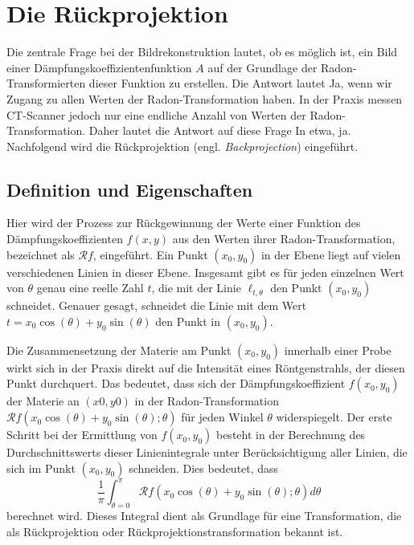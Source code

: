 %
%
%
%
\section{Die Rückprojektion
	\label{ct:section:ruekprojektion}}
Die zentrale Frage bei der Bildrekonstruktion lautet, ob es möglich ist, ein Bild einer Dämpfungskoeffizientenfunktion $A$ auf der Grundlage der Radon-Transformierten dieser Funktion zu erstellen. Die Antwort lautet \glqq Ja\grqq, wenn wir Zugang zu allen Werten der Radon-Transformation haben. In der Praxis messen CT-Scanner jedoch nur eine endliche Anzahl von Werten der Radon-Transformation. Daher lautet die Antwort auf diese Frage \glqq In etwa, ja\grqq. Nachfolgend wird die Rückprojektion (engl. \emph{Backprojection}) eingeführt.  

\subsection{Definition und Eigenschaften
	\label{ct:subsection:defnprop}}
Hier wird der Prozess zur Rückgewinnung der Werte einer Funktion des Dämpfungskoeffizienten $f(x, y)$ aus den Werten ihrer Radon-Transformation, bezeichnet als $\mathscr{R}f$, eingeführt. Ein Punkt $(x_0, y_0)$ in der Ebene liegt auf vielen verschiedenen Linien in dieser Ebene. Insgesamt gibt es für jeden einzelnen Wert von $\theta$ genau eine reelle Zahl $t$, die mit der Linie $\ell_{t,\theta}$ den Punkt $(x_0, y_0)$ schneidet. Genauer gesagt, schneidet die Linie mit dem Wert $t = x_0\cos(\theta) + y_0\sin(\theta)$ den Punkt in $(x_0, y_0)$.  

Die Zusammensetzung der Materie am Punkt $(x_0, y_0)$ innerhalb einer Probe wirkt sich in der Praxis direkt auf die Intensität eines Röntgenstrahls, der diesen Punkt durchquert. Das bedeutet, dass sich der Dämpfungskoeffizient $f(x_0, y_0)$ der Materie an $(x0, y0)$ in der Radon-Transformation $\mathscr{R}f(x_0\cos(\theta) + y_0\sin(\theta); \theta)$ für jeden Winkel $\theta$ widerspiegelt. Der erste Schritt bei der Ermittlung von $f(x_0, y_0)$ besteht in der Berechnung des Durchschnittswerts dieser Linienintegrale unter Berücksichtigung aller Linien, die sich im Punkt $(x_0, y_0)$ schneiden. Dies bedeutet, dass
\begin{equation}
	\dfrac{1}{\pi}\int_{\theta=0}^{\pi} \mathscr{R}f(x_0\cos(\theta) + y_0\sin(\theta); \theta) d\theta
\end{equation}
berechnet wird. Dieses Integral dient als Grundlage für eine Transformation, die als Rückprojektion oder Rückprojektionstransformation bekannt ist.

